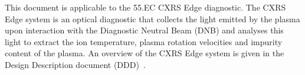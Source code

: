 \documentclass[../main.tex]{subfiles}
\begin{document}
This document is applicable to the 55.EC CXRS Edge diagnostic. The CXRS Edge system is an optical diagnostic that collects the light emitted by the plasma upon interaction with the Diagnostic Neutral Beam (DNB) and analyses this light to extract the ion temperature, plasma rotation velocities and impurity content of the plasma. An overview of the CXRS Edge system is given in the Design Description document (DDD)~\cite{ddd_cxrs_edge}.
\end{document}
